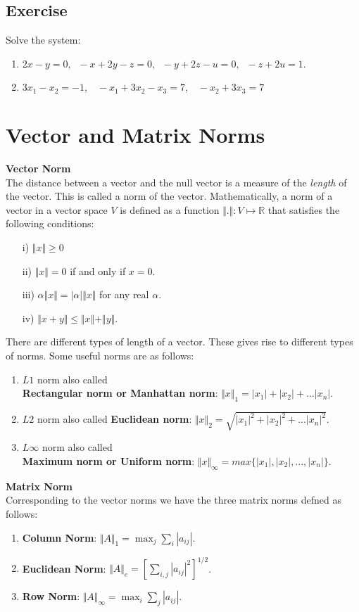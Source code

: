 \documentclass[aima203_lecturenotes_ku.tex]{subfiles}
\begin{document}
\subsection{Exercise}
Solve the system:
\begin{enumerate}
\item $2x-y=0, \;\; -x+2y-z=0, \;\; -y+2z-u=0, \;\; -z+2u=1$.
\item $3x_1 - x_2 = -1, \;\;\; -x_1+3x_2-x_3 = 7, \;\;\; -x_2+3x_3 =7$
\end{enumerate}
\section{Vector and Matrix Norms}
\textbf{Vector Norm} \\[1mm]
The distance between a vector and the null vector is a measure of the \textit{length} of the vector. This is called a norm of the vector. Mathematically, a norm of a vector in a vector space $V$ is defined as a function $\displaystyle \Vert .  \Vert : V \mapsto \mathbb{R}$ that satisfies the following conditions:
\begin{enumerate}
\item [i)] $\Vert x \Vert \geq 0$
\item [ii)] $\Vert x \Vert = 0$ if and only if $x=0$.
\item [iii)] $\alpha \Vert x \Vert = \vert \alpha \vert \Vert x \Vert $ for any real $\alpha$.
\item [iv)] $\Vert x + y \Vert \leq \Vert x \Vert + \Vert y \Vert$.
\end{enumerate}
There are different types of length of a vector. These gives rise to different types of norms. Some useful norms are as follows:
\begin{enumerate}
\item $L1$ norm also called \\
  \textbf{Rectangular norm or Manhattan norm}: $\Vert x \Vert _1 = |x_1| + |x_2| +... |x_n| $.
\item $L2$ norm also called \textbf{Euclidean norm}: $\Vert x \Vert _2 = \sqrt{|x_1|^2 + |x_2|^2 +... |x_n|^2} $.
\item $L\infty$ norm also called \\
  \textbf{Maximum norm or Uniform norm}: $\Vert x \Vert _{\infty} = max\{|x_1| , |x_2| ,..., |x_n|\} $.
\end{enumerate}
\noindent
\textbf{Matrix Norm} \\[1mm]
Corresponding to the vector norms we have the three matrix norms defned as follows:
\begin{enumerate}
\item \textbf{Column Norm}: $\displaystyle \Vert A \Vert _1 = \max_j \sum_i |a_{ij}|$.
\item \textbf{Euclidean Norm}: $\displaystyle \Vert A \Vert _e = \left [\sum_{i,j} |a_{ij}|^2 \right ] ^{1/2}$.
\item \textbf{Row Norm}: $\displaystyle \Vert A \Vert _{\infty} = \max_i \sum_j |a_{ij}|$.
\end{enumerate}
\end{document}
